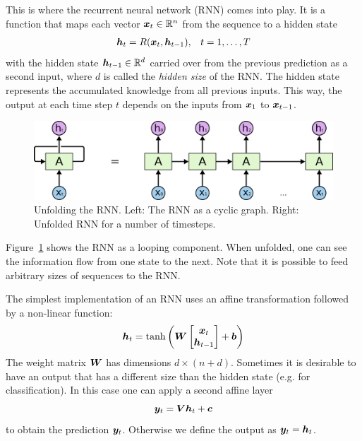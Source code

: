 		This is where the recurrent neural network (RNN) comes into play.
		It is a function that maps each vector $\bm{x}_t \in \mathbb{R}^n$ from the sequence to a hidden state
		\begin{eqnarray}
			\bm{h}_t = R(\bm{x}_t, \bm{h}_{t-1}), & &t = 1, \dots, T
		\end{eqnarray}
		with the hidden state $\bm{h}_{t-1} \in \mathbb{R}^d$ carried over from the previous prediction as a second input, where $d$ is called the \emph{hidden size} of the RNN. 
		The hidden state represents the accumulated knowledge from all previous inputs.
		This way, the output at each time step $t$ depends on the inputs from $\bm{x}_1$ to $\bm{x}_{t - 1}$.
		\begin{figure}[tb]
			\centering
			\includegraphics[width=0.9\linewidth]{Images/LSTM/RNN-unrolled}
			\caption[Unfolding the RNN]
			{Unfolding the RNN. Left: The RNN as a cyclic graph. 
				Right: Unfolded RNN for a number of timesteps.
				\imagecourtesycolah}
			\label{fig:RNN-unrolled}
		\end{figure}
		Figure~\ref{fig:RNN-unrolled} shows the RNN as a looping component.
		When unfolded, one can see the information flow from one state to the next.
		Note that it is possible to feed arbitrary sizes of sequences to the RNN.
		
		The simplest implementation of an RNN uses an affine transformation followed by a non-linear function:
		\begin{equation}
			\bm{h}_t = 
			\tanh \left(
			\bm{W}
			\begin{bmatrix}
				\bm{x}_t \\
				\bm{h}_{t-1}
			\end{bmatrix}
			+ \bm{b}
			\right)
		\end{equation}
		The weight matrix $\bm{W}$ has dimensions $d \times (n + d)$.
		Sometimes it is desirable to have an output that has a different size than the hidden state (e.g. for classification).
		In this case one can apply a second affine layer
		\begin{equation}
			\bm{y}_t = \bm{V} \bm{h}_t + \bm{c}
		\end{equation}
		to obtain the prediction $\bm{y}_t$.
		Otherwise we define the output as $\bm{y}_t = \bm{h}_t$.
		
